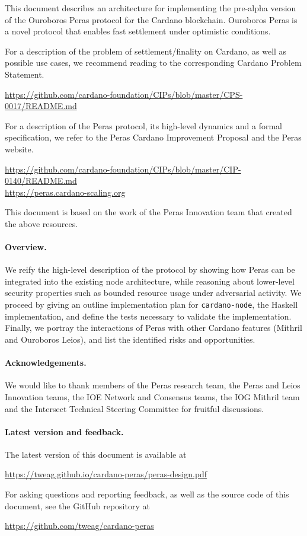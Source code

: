 This document describes an architecture for implementing the pre-alpha version of the Ouroboros Peras protocol for the Cardano blockchain.
Ouroboros Peras is a novel protocol that enables fast settlement under optimistic conditions.

For a description of the problem of settlement/finality on Cardano, as well as possible use cases, we recommend reading to the corresponding Cardano Problem Statement.
\begin{center}
  \url{https://github.com/cardano-foundation/CIPs/blob/master/CPS-0017/README.md}
\end{center}
For a description of the Peras protocol, its high-level dynamics and a formal specification, we refer to the Peras Cardano Improvement Proposal and the Peras website.
\begin{center}
  \url{https://github.com/cardano-foundation/CIPs/blob/master/CIP-0140/README.md}\\
  \url{https://peras.cardano-scaling.org}
\end{center}
This document is based on the work of the Peras Innovation team that created the above resources.

\paragraph{Overview.}
We reify the high-level description of the protocol by showing how Peras can be integrated into the existing node architecture, while reasoning about lower-level security properties such as bounded resource usage under adversarial activity.
We proceed by giving an outline implementation plan for \texttt{cardano-node}, the Haskell implementation, and define the tests necessary to validate the implementation.
Finally, we portray the interactions of Peras with other Cardano features (Mithril and Ouroboros Leios), and list the identified risks and opportunities.

\paragraph{Acknowledgements.}
We would like to thank members of the Peras research team, the Peras and Leios Innovation teams, the IOE Network and Consensus teams, the IOG Mithril team and the Intersect Technical Steering Committee for fruitful discussions.

\paragraph{Latest version and feedback.}
The latest version of this document is available at
\begin{center}
  \url{https://tweag.github.io/cardano-peras/peras-design.pdf}
\end{center}
For asking questions and reporting feedback, as well as the source code of this document, see the GitHub repository at
\begin{center}
  \url{https://github.com/tweag/cardano-peras}
\end{center}

